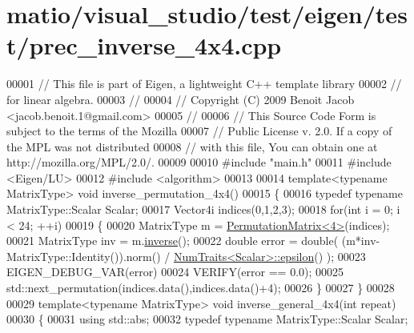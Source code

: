 \hypertarget{matio_2visual__studio_2test_2eigen_2test_2prec__inverse__4x4_8cpp_source}{}\section{matio/visual\+\_\+studio/test/eigen/test/prec\+\_\+inverse\+\_\+4x4.cpp}
\label{matio_2visual__studio_2test_2eigen_2test_2prec__inverse__4x4_8cpp_source}

\begin{DoxyCode}
00001 \textcolor{comment}{// This file is part of Eigen, a lightweight C++ template library}
00002 \textcolor{comment}{// for linear algebra.}
00003 \textcolor{comment}{//}
00004 \textcolor{comment}{// Copyright (C) 2009 Benoit Jacob <jacob.benoit.1@gmail.com>}
00005 \textcolor{comment}{//}
00006 \textcolor{comment}{// This Source Code Form is subject to the terms of the Mozilla}
00007 \textcolor{comment}{// Public License v. 2.0. If a copy of the MPL was not distributed}
00008 \textcolor{comment}{// with this file, You can obtain one at http://mozilla.org/MPL/2.0/.}
00009 
00010 \textcolor{preprocessor}{#include "main.h"}
00011 \textcolor{preprocessor}{#include <Eigen/LU>}
00012 \textcolor{preprocessor}{#include <algorithm>}
00013 
00014 \textcolor{keyword}{template}<\textcolor{keyword}{typename} MatrixType> \textcolor{keywordtype}{void} inverse\_permutation\_4x4()
00015 \{
00016   \textcolor{keyword}{typedef} \textcolor{keyword}{typename} MatrixType::Scalar Scalar;
00017   Vector4i indices(0,1,2,3);
00018   \textcolor{keywordflow}{for}(\textcolor{keywordtype}{int} i = 0; i < 24; ++i)
00019   \{
00020     MatrixType m = \hyperlink{group___core___module_class_eigen_1_1_permutation_matrix}{PermutationMatrix<4>}(indices);
00021     MatrixType inv = m.\hyperlink{group___core___module_adb9af427f317202366c2832876064eb3}{inverse}();
00022     \textcolor{keywordtype}{double} error = double( (m*inv-MatrixType::Identity()).norm() / 
      \hyperlink{group___core___module_struct_eigen_1_1_num_traits}{NumTraits<Scalar>::epsilon}() );
00023     EIGEN\_DEBUG\_VAR(error)
00024     VERIFY(error == 0.0);
00025     std::next\_permutation(indices.data(),indices.data()+4);
00026   \}
00027 \}
00028 
00029 \textcolor{keyword}{template}<\textcolor{keyword}{typename} MatrixType> \textcolor{keywordtype}{void} inverse\_general\_4x4(\textcolor{keywordtype}{int} repeat)
00030 \{
00031   \textcolor{keyword}{using} std::abs;
00032   \textcolor{keyword}{typedef} \textcolor{keyword}{typename} MatrixType::Scalar Scalar;

\end{DoxyCode}
